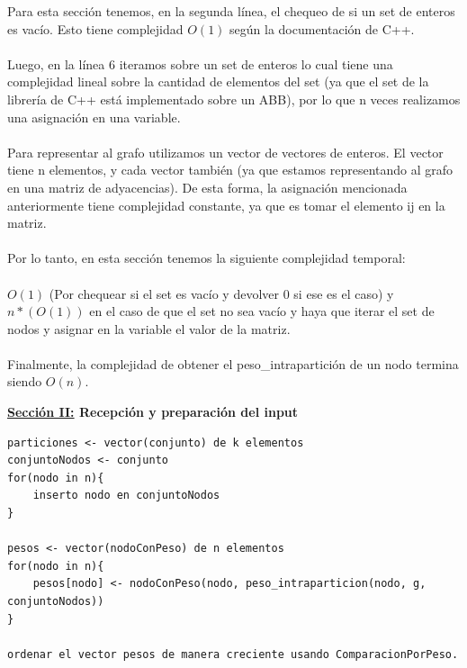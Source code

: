 Para esta sección tenemos, en la segunda línea, el chequeo de si un set de enteros es vacío. Esto tiene complejidad $O(1)$ según la documentación de C++.\\\\
Luego, en la línea 6 iteramos sobre un set de enteros lo cual tiene una complejidad lineal sobre la cantidad de elementos del set (ya que el set de la librería de C++ está implementado sobre un ABB), por lo que n veces realizamos una asignación en una variable.\\\\
Para representar al grafo utilizamos un vector de vectores de enteros. El vector tiene n elementos, y cada vector también (ya que estamos representando al grafo en una matriz de adyacencias). De esta forma, la asignación mencionada anteriormente tiene complejidad constante, ya que es tomar el elemento ij en la matriz.\\\\
Por lo tanto, en esta sección tenemos la siguiente complejidad temporal:\\\\
$O(1)$ (Por chequear si el set es vacío y devolver 0 si ese es el caso) y $n*(O(1))$ en el caso de que el set no sea vacío y haya que iterar el set de nodos y asignar en la variable el valor de la matriz.\\\\
Finalmente, la complejidad de obtener el peso\_intrapartición de un nodo termina siendo $O(n)$.


\textbf{\underline{Sección II:} Recepción y preparación del input}

\begin{lstlisting}[mathescape]
particiones <- vector(conjunto) de k elementos
conjuntoNodos <- conjunto
for(nodo in n){
	inserto nodo en conjuntoNodos
}

pesos <- vector(nodoConPeso) de n elementos
for(nodo in n){
	pesos[nodo] <- nodoConPeso(nodo, peso_intraparticion(nodo, g, conjuntoNodos))
}

ordenar el vector pesos de manera creciente usando ComparacionPorPeso.
\end{lstlisting}


